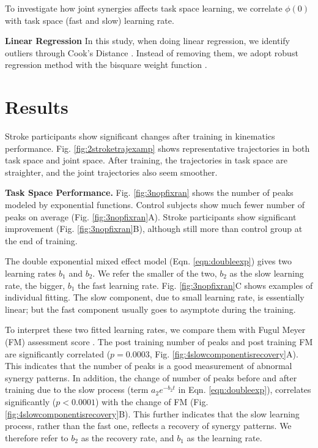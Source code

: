 To investigate how joint synergies affects task space learning, we correlate $ \phi(0) $ with task space (fast and slow) learning rate.

\textbf{Linear Regression}
In this study, when doing linear regression, we identify outliers through Cook's Distance \cite{}.
Instead of removing them, we adopt robust regression method with the bisquare weight function \cite{}.

\section{Results}

Stroke participants show significant changes after training in kinematics performance.
Fig. \ref{fig:2stroketrajexamp} shows representative trajectories in both task space and joint space. 
After training, the trajectories in task space are straighter, and the joint trajectories also seem smoother. 

\textbf{Task Space Performance.}
Fig. \ref{fig:3nopfixran} shows the number of peaks modeled by exponential functions.
Control subjects show much fewer number of peaks on average (Fig. \ref{fig:3nopfixran}A).
Stroke participants show significant improvement (Fig. \ref{fig:3nopfixran}B), although still more than control group at the end of training.

The double exponential mixed effect model (Eqn. \ref{eqn:doubleexp}) gives two learning rates $ b_1 $ and $ b_2 $. 
We refer the smaller of the two, $ b_2 $ as the slow learning rate, the bigger, $ b_1 $ the fast learning rate.
Fig. \ref{fig:3nopfixran}C shows examples of individual fitting.
The slow component, due to small learning rate, is essentially linear; but the fast component usually goes to asymptote during the training.

To interpret these two fitted learning rates, we compare them with Fugul Meyer (FM) assessment score \cite{}.
The post training number of peaks and post training FM are significantly correlated ($ p = 0.0003 $, Fig. \ref{fig:4slowcomponentisrecovery}A).
This indicates that the number of peaks is a good measurement of abnormal synergy patterns.
In addition, the change of number of peaks before and after training due to the slow process (term $ a_2e^{-b_2t} $ in Eqn. \ref{eqn:doubleexp}), correlates significantly ($ p<0.0001 $) with the change of FM (Fig. \ref{fig:4slowcomponentisrecovery}B).
This further indicates that the slow learning process, rather than the fast one, reflects a recovery of synergy patterns.
We therefore refer to $ b_2 $ as the recovery rate, and $ b_1 $ as the learning rate.

